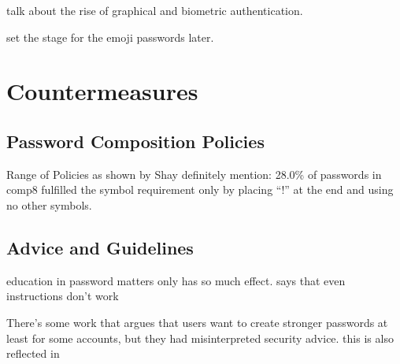 talk about the rise of graphical and biometric authentication. 


set the stage for the emoji passwords later. 


\section{Countermeasures}


	\subsection{Password Composition Policies}
	
	Range of Policies as shown by Shay \cite{Shay2014CanLongPasswordsBeSecureAndUsable}
	definitely mention: 28.0\% of passwords in comp8 fulfilled the symbol requirement only by placing ``!'' at the end and using no other symbols. 
	
	\cite{ZhangKennedy2016RevisitingPasswordRules}
	
	
	\cite{Inglesant2010TrueCostOfUnusablePolicies} 
	
	\cite{Florencio2014AdministratorsGuide} 
	
	\cite{Ur2015PWCreationLab}
	
	\cite{Shay2010EncounteringPasswordRequirements}
	
	\cite{Shay2016DesigningPasswordPolicies}
	
	\cite{Weir2010MetricsPolicies}
	
	\cite{Wang2015EmperorsPolicies}
	
	
	\cite{Florencio2010WhereDoPoliciesComeFrom}
	
	\cite{Horsch2016PasswordPolicyMarkup}
	
	\cite{Chiasson2015QuantifyingExpiration}
	\cite{Blocki2013OptimizingPasswordPolicies}
	\cite{Komanduri2011OfPasswordsAndPeople}
	
	
	

	\subsection{Advice and Guidelines}
	
	education in password matters only has so much effect. 
	\cite{Forget2007HelpingUsers} says that even instructions don't work
	
	There's some work that argues that users want to create stronger passwords at least for some accounts, but they had
	misinterpreted security advice. 
	this is also reflected in \cite{Ur2016PerceptionsPassword}
	

